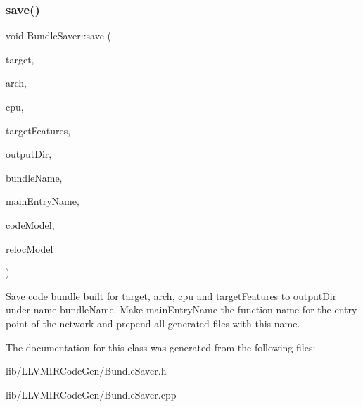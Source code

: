 \subsubsection{\texorpdfstring{save()}{save()}}
{\footnotesize\ttfamily void Bundle\+Saver\+::save (\begin{DoxyParamCaption}\item[{llvm\+::\+String\+Ref}]{target,  }\item[{llvm\+::\+String\+Ref}]{arch,  }\item[{llvm\+::\+String\+Ref}]{cpu,  }\item[{const llvm\+::\+Small\+Vector\+Impl$<$ std\+::string $>$ \&}]{target\+Features,  }\item[{llvm\+::\+String\+Ref}]{output\+Dir,  }\item[{llvm\+::\+String\+Ref}]{bundle\+Name,  }\item[{llvm\+::\+String\+Ref}]{main\+Entry\+Name,  }\item[{llvm\+::\+Code\+Model\+::\+Model}]{code\+Model,  }\item[{llvm\+::\+Reloc\+::\+Model}]{reloc\+Model }\end{DoxyParamCaption})}

Save code bundle built for {\ttfamily target}, {\ttfamily arch}, {\ttfamily cpu} and {\ttfamily target\+Features} to {\ttfamily output\+Dir} under name {\ttfamily bundle\+Name}. Make {\ttfamily main\+Entry\+Name} the function name for the entry point of the network and prepend all generated files with this name. 

The documentation for this class was generated from the following files\+:\begin{DoxyCompactItemize}
\item 
lib/\+L\+L\+V\+M\+I\+R\+Code\+Gen/Bundle\+Saver.\+h\item 
lib/\+L\+L\+V\+M\+I\+R\+Code\+Gen/Bundle\+Saver.\+cpp\end{DoxyCompactItemize}
